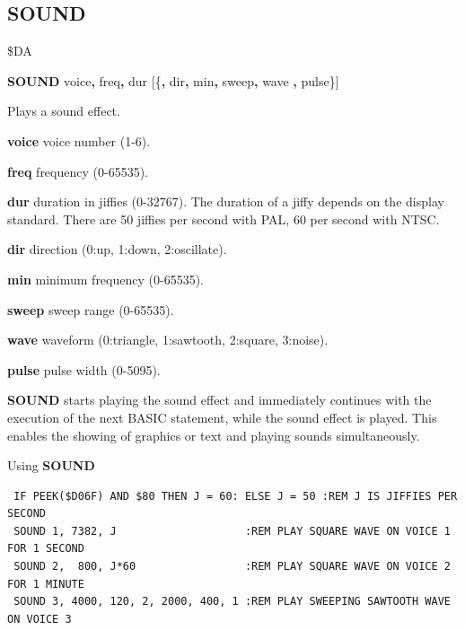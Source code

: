 \subsection{SOUND}
\begin{description}[leftmargin=2cm,style=nextline]
\item [Token:] \$DA
\item [Format:] {\bf SOUND} voice{\bf,} freq{\bf,} dur
                [\{{\bf,} dir{\bf,} min{\bf,} sweep{\bf,} wave
                {\bf,} pulse\}]

\item [Usage:] Plays a sound effect.

               {\bf voice} voice number (1-6).

               {\bf freq} frequency (0-65535).

               {\bf dur} duration in jiffies (0-32767).
                The duration of a jiffy depends on the display standard.
                There are 50 jiffies per second with PAL, 60 per second with NTSC.

               {\bf dir} direction (0:up, 1:down, 2:oscillate).

               {\bf min} minimum frequency (0-65535).

               {\bf sweep} sweep range (0-65535).

               {\bf wave} waveform (0:triangle, 1:sawtooth, 2:square,
               3:noise).

               {\bf pulse} pulse width (0-5095).

\item [Remarks:] {\bf SOUND} starts playing the sound
               effect and immediately continues with the execution
               of the next BASIC statement, while the sound effect
               is played. This enables the showing of graphics or text
               and playing sounds simultaneously.

\item [Examples:] Using {\bf SOUND}
\begin{tcolorbox}[colback=black,coltext=white]
\verbatimfont{\codefont}
\begin{verbatim}
 IF PEEK($D06F) AND $80 THEN J = 60: ELSE J = 50 :REM J IS JIFFIES PER SECOND
 SOUND 1, 7382, J                    :REM PLAY SQUARE WAVE ON VOICE 1 FOR 1 SECOND
 SOUND 2,  800, J*60                 :REM PLAY SQUARE WAVE ON VOICE 2 FOR 1 MINUTE
 SOUND 3, 4000, 120, 2, 2000, 400, 1 :REM PLAY SWEEPING SAWTOOTH WAVE ON VOICE 3
\end{verbatim}
\end{tcolorbox}
\end{description}


